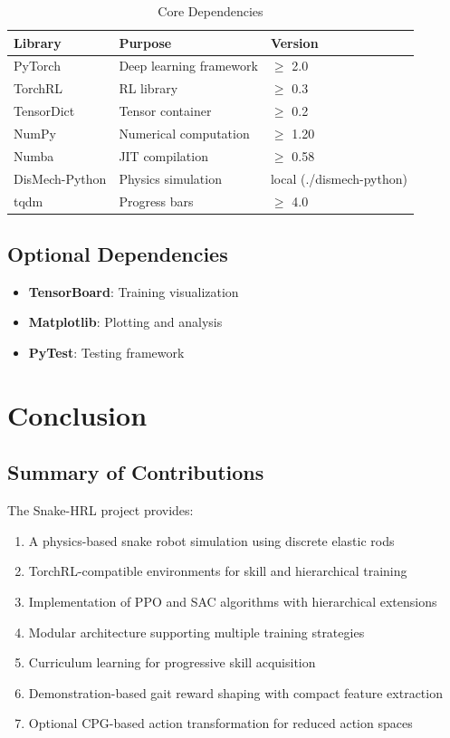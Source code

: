 \documentclass[11pt]{article}
\begin{document}
\begin{table}[H]
\centering
\caption{Core Dependencies}
\begin{tabular}{@{}lll@{}}
\toprule
\textbf{Library} & \textbf{Purpose} & \textbf{Version} \\
\midrule
PyTorch & Deep learning framework & $\geq$ 2.0 \\
TorchRL & RL library & $\geq$ 0.3 \\
TensorDict & Tensor container & $\geq$ 0.2 \\
NumPy & Numerical computation & $\geq$ 1.20 \\
Numba & JIT compilation & $\geq$ 0.58 \\
DisMech-Python & Physics simulation & local (./dismech-python) \\
tqdm & Progress bars & $\geq$ 4.0 \\
\bottomrule
\end{tabular}
\end{table}

\subsection{Optional Dependencies}
\begin{itemize}
    \item \textbf{TensorBoard}: Training visualization
    \item \textbf{Matplotlib}: Plotting and analysis
    \item \textbf{PyTest}: Testing framework
\end{itemize}

\section{Conclusion}

\subsection{Summary of Contributions}

The Snake-HRL project provides:
\begin{enumerate}
    \item A physics-based snake robot simulation using discrete elastic rods
    \item TorchRL-compatible environments for skill and hierarchical training
    \item Implementation of PPO and SAC algorithms with hierarchical extensions
    \item Modular architecture supporting multiple training strategies
    \item Curriculum learning for progressive skill acquisition
    \item Demonstration-based gait reward shaping with compact feature extraction
    \item Optional CPG-based action transformation for reduced action spaces
\end{enumerate}
\end{document}
